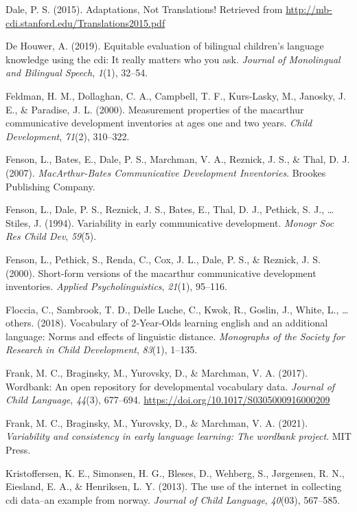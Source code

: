 \documentclass[
  english,
  ,man,floatsintext]{apa6}
\begin{document}
\leavevmode\hypertarget{ref-dale2015}{}%
Dale, P. S. (2015). Adaptations, Not Translations! Retrieved from \url{http://mb-cdi.stanford.edu/Translations2015.pdf}

\leavevmode\hypertarget{ref-DeHouwer2019}{}%
De Houwer, A. (2019). Equitable evaluation of bilingual children's language knowledge using the cdi: It really matters who you ask. \emph{Journal of Monolingual and Bilingual Speech}, \emph{1}(1), 32--54.

\leavevmode\hypertarget{ref-feldman2000}{}%
Feldman, H. M., Dollaghan, C. A., Campbell, T. F., Kurs-Lasky, M., Janosky, J. E., \& Paradise, J. L. (2000). Measurement properties of the macarthur communicative development inventories at ages one and two years. \emph{Child Development}, \emph{71}(2), 310--322.

\leavevmode\hypertarget{ref-fenson2007}{}%
Fenson, L., Bates, E., Dale, P. S., Marchman, V. A., Reznick, J. S., \& Thal, D. J. (2007). \emph{MacArthur-Bates Communicative Development Inventories}. Brookes Publishing Company.

\leavevmode\hypertarget{ref-fenson1994}{}%
Fenson, L., Dale, P. S., Reznick, J. S., Bates, E., Thal, D. J., Pethick, S. J., \ldots{} Stiles, J. (1994). Variability in early communicative development. \emph{Monogr Soc Res Child Dev}, \emph{59}(5).

\leavevmode\hypertarget{ref-fenson2000b}{}%
Fenson, L., Pethick, S., Renda, C., Cox, J. L., Dale, P. S., \& Reznick, J. S. (2000). Short-form versions of the macarthur communicative development inventories. \emph{Applied Psycholinguistics}, \emph{21}(1), 95--116.

\leavevmode\hypertarget{ref-floccia2018}{}%
Floccia, C., Sambrook, T. D., Delle Luche, C., Kwok, R., Goslin, J., White, L., \ldots{} others. (2018). Vocabulary of 2‐Year‐Olds learning english and an additional language: Norms and effects of linguistic distance. \emph{Monographs of the Society for Research in Child Development}, \emph{83}(1), 1--135.

\leavevmode\hypertarget{ref-frank2017b}{}%
Frank, M. C., Braginsky, M., Yurovsky, D., \& Marchman, V. A. (2017). Wordbank: An open repository for developmental vocabulary data. \emph{Journal of Child Language}, \emph{44}(3), 677--694. \url{https://doi.org/10.1017/S0305000916000209}

\leavevmode\hypertarget{ref-Frank2021}{}%
Frank, M. C., Braginsky, M., Yurovsky, D., \& Marchman, V. A. (2021). \emph{Variability and consistency in early language learning: The wordbank project}. MIT Press.

\leavevmode\hypertarget{ref-kristoffersen2013}{}%
Kristoffersen, K. E., Simonsen, H. G., Bleses, D., Wehberg, S., Jørgensen, R. N., Eiesland, E. A., \& Henriksen, L. Y. (2013). The use of the internet in collecting cdi data--an example from norway. \emph{Journal of Child Language}, \emph{40}(03), 567--585.

\endgroup
\end{document}
